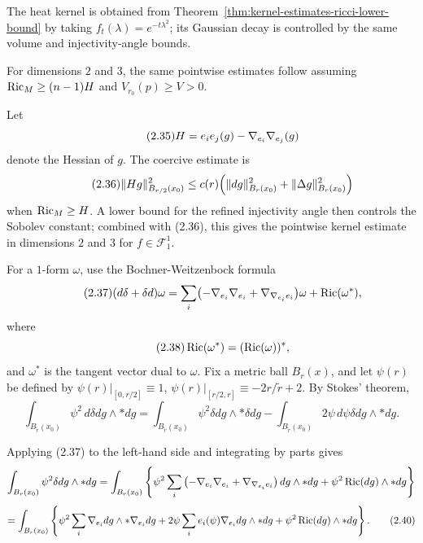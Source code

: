 The heat kernel is obtained from Theorem~\ref{thm:kernel-estimates-ricci-lower-bound}
by taking $f_t(\lambda)=e^{-t\lambda^2}$; its Gaussian decay is controlled by
the same volume and injectivity-angle bounds.

For dimensions $2$ and $3$, the same pointwise estimates follow assuming
$\operatorname{Ric}_M\geq(n-1)H$ and $V_{r_0}(p)\geq V>0$.

Let
\begin{equation}\tag{2.35}
H=e_i e_j(g)-\nabla_{e_i}\nabla_{e_j}(g)
\end{equation}
denote the Hessian of $g$. The coercive estimate is
\begin{equation}\tag{2.36}
\|Hg\|_{B_{r/2}(x_0)}^{2}\le c(r)\Bigl(\|dg\|_{B_r(x_0)}^{2}+\|\Delta g\|_{B_r(x_0)}^{2}\Bigr)
\end{equation}
when $\operatorname{Ric}_M\ge H$. A lower bound for the refined injectivity angle then
controls the Sobolev constant; combined with (2.36), this gives the pointwise
kernel estimate in dimensions $2$ and $3$ for $f\in\mathscr{F}_1^1$.

For a $1$-form $\omega$, use the Bochner-Weitzenbock formula
\begin{equation}\tag{2.37}
(d\delta+\delta d)\omega=\sum_i\bigl(-\nabla_{e_i}\nabla_{e_i}+\nabla_{\nabla_{e_i}e_i}\bigr)\omega+\operatorname{Ric}(\omega^*),
\end{equation}
where
\begin{equation}\tag{2.38}
\operatorname{Ric}(\omega^*)=(\operatorname{Ric}(\omega))^*,
\end{equation}
and $\omega^*$ is the tangent vector dual to $\omega$. Fix a metric ball $B_r(x)$, and let $\psi(r)$ be defined by $\psi(r)|_{[0,r/2]}\equiv 1$, $\psi(r)|_{[r/2,r]}\equiv -2r/\tilde r+2$. By Stokes' theorem,
\begin{equation}\tag{2.39}
\int_{B_{\tilde r}(x_0)}\psi^2\, d\delta dg\wedge *dg
=\int_{B_{\tilde r}(x_0)}\psi^2\delta dg\wedge *\delta dg
-\int_{B_{\tilde r}(x_0)}2\psi\, d\psi\delta dg\wedge *dg.
\end{equation}

Applying (2.37) to the left-hand side and integrating by parts gives
\[
\int_{B_r(x_0)} \psi^2 \delta dg \wedge *dg
= \int_{B_r(x_0)} \left\{ \psi^2 \sum_i \left(-\nabla_{e_i}\nabla_{e_i} + \nabla_{\nabla_{e_i} e_i}\right)dg \wedge *dg + \psi^2 \operatorname{Ric}(dg) \wedge *dg \right\}
\]
\begin{equation}
= \int_{B_r(x_0)} \left\{ \psi^2 \sum_i \nabla_{e_i}dg \wedge *\nabla_{e_i}dg + 2\psi \sum_i e_i(\psi)\nabla_{e_i}dg \wedge *dg
+ \psi^2 \operatorname{Ric}(dg) \wedge *dg \right\}.
\tag{2.40}
\end{equation}


